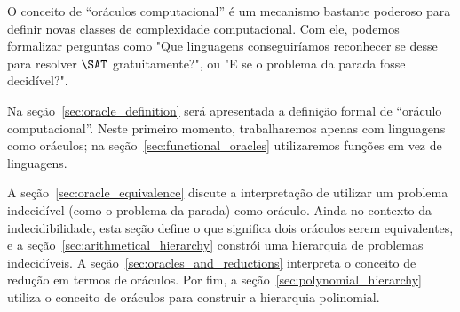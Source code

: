 O conceito de ``oráculos computacional'' é um mecanismo bastante poderoso
para definir novas classes de complexidade computacional.
Com ele,
podemos formalizar perguntas como
"Que linguagens conseguiríamos reconhecer
se desse para resolver $\SAT$ gratuitamente?",
ou "E se o problema da parada fosse decidível?".

Na seção~\ref{sec:oracle_definition} será apresentada a definição formal
de ``oráculo computacional''.
Neste primeiro momento,
trabalharemos apenas com linguagens como oráculos;
na seção~\ref{sec:functional_oracles}
utilizaremos funções em vez de linguagens.

A seção~\ref{sec:oracle_equivalence}
discute a interpretação de utilizar um problema indecidível
(como o problema da parada)
como oráculo.
Ainda no contexto da indecidibilidade,
esta seção define o que significa dois oráculos serem equivalentes,
e a seção~\ref{sec:arithmetical_hierarchy}
constrói uma hierarquia de problemas indecidíveis.
A seção~\ref{sec:oracles_and_reductions}
interpreta o conceito de redução em termos de oráculos.
Por fim, a seção~\ref{sec:polynomial_hierarchy}
utiliza o conceito de oráculos para construir a hierarquia polinomial.
